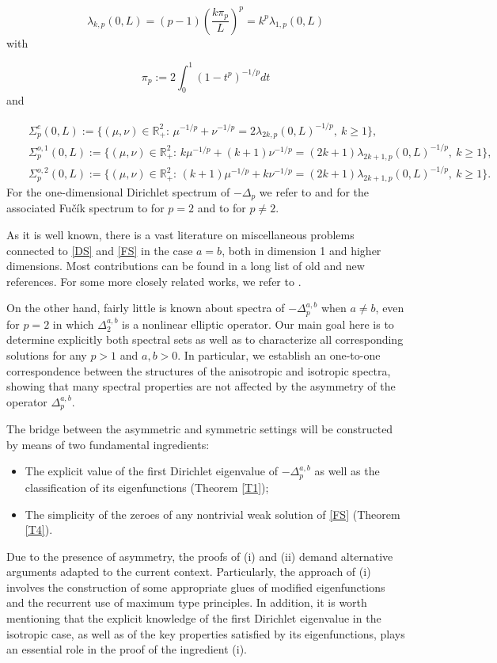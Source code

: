 \documentclass[a4paper,11pt]{article}
\newcommand{\R}{\mathbb{R}}
\begin{document}
{\[
\lambda_{k,p}(0,L) = (p-1) \left( \frac{k \pi_p}{L} \right)^p = k^p \lambda_{1,p}(0,L)
\]
with

\[
\pi_p := 2 \int_0^1 (1 - t^p)^{-1/p} dt
\]
and

\begin{eqnarray*}
&& \Sigma^e_p(0,L):= \{(\mu, \nu) \in \R_+^2:\, \mu^{-1/p} + \nu^{-1/p} = 2 \lambda_{2k,p}(0,L)^{-1/p},\ k \geq 1\},\\
&& \Sigma^{o,1}_p(0,L):= \{(\mu, \nu) \in \R_+^2:\, k \mu^{-1/p} + (k + 1) \nu^{-1/p} = (2k + 1) \lambda_{2k+1,p}(0,L)^{-1/p},\ k \geq 1\}, \\
&& \Sigma^{o,2}_p(0,L):= \{(\mu, \nu) \in \R_+^2:\, (k+1) \mu^{-1/p} + k \nu^{-1/p} = (2k + 1) \lambda_{2k+1,p}(0,L)^{-1/p},\ k \geq 1\}.
\end{eqnarray*}
For the one-dimensional Dirichlet spectrum of $- \Delta_p$ we refer to \cite{dPEM} and for the associated Fu\v cík spectrum to \cite{D,F} for $p = 2$ and to \cite{Dra} for $p \neq 2$.

As it is well known, there is a vast literature on miscellaneous problems connected to \eqref{DS} and \eqref{FS} in the case $a = b$, both in dimension 1 and higher dimensions. Most contributions can be found in a long list of old and new references. For some more closely related works, we refer to \cite{A, AT, AriC, AriCCuGo, BWZ, CudeFG, CuG, DD, deFG, dPDM, DraGT, DraS1, DraS2, DraS3, DraT, KL, LL, L, MaT, M, S, S1, T}.

On the other hand, fairly little is known about spectra of $- \Delta^{a,b}_p$ when $a \neq b$, even for $p = 2$ in which $\Delta^{a,b}_2$ is a nonlinear elliptic operator. Our main goal here is to determine explicitly both spectral sets as well as to characterize all corresponding solutions for any $p > 1$ and $a, b > 0$. In particular, we establish an one-to-one correspondence between the structures of the anisotropic and isotropic spectra, showing that many spectral properties are not affected by the asymmetry of the operator $\Delta^{a,b}_p$.

The bridge between the asymmetric and symmetric settings will be constructed by means of two fundamental ingredients:

\begin{itemize}
\item[(i)] The explicit value of the first Dirichlet eigenvalue of $-\Delta^{a,b}_p$ as well as the classification of its eigenfunctions (Theorem \ref{T1});
\item[(ii)] The simplicity of the zeroes of any nontrivial weak solution of \eqref{FS} (Theorem \ref{T4}).
\end{itemize}
Due to the presence of asymmetry, the proofs of (i) and (ii) demand alternative arguments adapted to the current context. Particularly, the approach of (i) involves the construction of some appropriate glues of modified eigenfunctions and the recurrent use of maximum type principles. In addition, it is worth mentioning that the explicit knowledge of the first Dirichlet eigenvalue in the isotropic case, as well as of the key properties satisfied by its eigenfunctions, plays an essential role in the proof of the ingredient (i).

}
\end{document}
